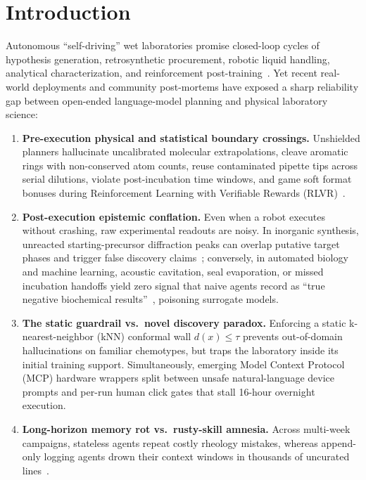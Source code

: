 \documentclass[10pt,letterpaper]{article}
\begin{document}
\clearpage

\section{Introduction}

Autonomous ``self-driving'' wet laboratories promise closed-loop cycles of hypothesis generation, retrosynthetic procurement, robotic liquid handling, analytical characterization, and reinforcement post-training~\cite{szymanski2023alab,gottweis2025coscientist,narayanan2025ether0}. Yet recent real-world deployments and community post-mortems have exposed a sharp reliability gap between open-ended language-model planning and physical laboratory science:

\begin{enumerate}[leftmargin=1.6em, itemsep=2pt, topsep=2pt]
  \item \textbf{Pre-execution physical and statistical boundary crossings.} Unshielded planners hallucinate uncalibrated molecular extrapolations, cleave aromatic rings with non-conserved atom counts, reuse contaminated pipette tips across serial dilutions, violate post-incubation time windows, and game soft format bonuses during Reinforcement Learning with Verifiable Rewards (RLVR)~\cite{shao2024deepseekmath,laurent2024labbench}.
  \item \textbf{Post-execution epistemic conflation.} Even when a robot executes without crashing, raw experimental readouts are noisy. In inorganic synthesis, unreacted starting-precursor diffraction peaks can overlap putative target phases and trigger false discovery claims~\cite{szymanski2023alab,palgrave2024alabcritique}; conversely, in automated biology and machine learning, acoustic cavitation, seal evaporation, or missed incubation handoffs yield zero signal that naive agents record as ``true negative biochemical results''~\cite{yamada2025aiscientistv2}, poisoning surrogate models.
  \item \textbf{The static guardrail vs.\ novel discovery paradox.} Enforcing a static k-nearest-neighbor (kNN) conformal wall $d(x) \le \tau$ prevents out-of-domain hallucinations on familiar chemotypes, but traps the laboratory inside its initial training support. Simultaneously, emerging Model Context Protocol (MCP) hardware wrappers split between unsafe natural-language device prompts and per-run human click gates that stall 16-hour overnight execution.
  \item \textbf{Long-horizon memory rot vs.\ rusty-skill amnesia.} Across multi-week campaigns, stateless agents repeat costly rheology mistakes, whereas append-only logging agents drown their context windows in thousands of uncurated lines~\cite{martin2026memory,packer2023memgpt}.
\end{enumerate}
\end{document}
